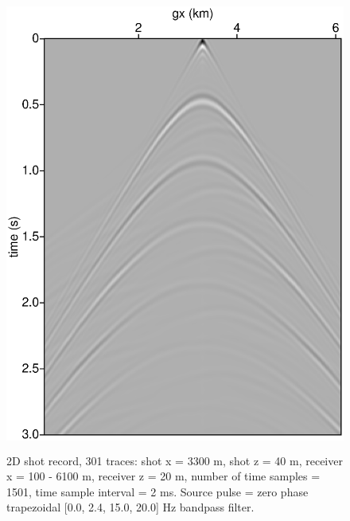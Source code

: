 \documentclass [12pt]{georeport}
\begin{document}
\begin{figure}
\label{fig3}
\includegraphics[height=15cm,width=15cm]{./Fig/fig3.ps}
\caption{2D shot record, 301 traces: shot x = 3300 m, shot z = 40 m, receiver x =
  100 - 6100 m, receiver z = 20 m, number of time samples = 1501, time
sample interval = 2 ms. Source pulse = zero phase trapezoidal [0.0,
2.4, 15.0, 20.0] Hz bandpass filter. }
\end{figure}
\end{document}
